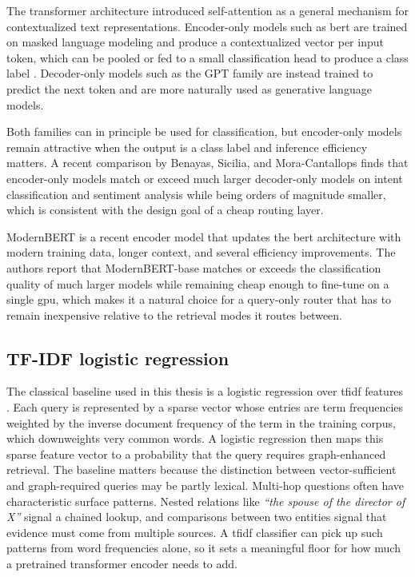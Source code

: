 \documentclass[english, bibtex]{kththesis}               %
\numberwithin{listing}{chapter}
\begin{document}
The transformer architecture \cite{vaswani2017attention} introduced self-attention as a general mechanism for contextualized text representations. Encoder-only models such as \gls{bert} are trained on masked language modeling and produce a contextualized vector per input token, which can be pooled or fed to a small classification head to produce a class label \cite{devlin2019bert}. Decoder-only models such as the GPT family are instead trained to predict the next token and are more naturally used as generative language models.

Both families can in principle be used for classification, but encoder-only models remain attractive when the output is a class label and inference efficiency matters. A recent comparison by Benayas, Sicilia, and Mora-Cantallops \cite{benayas2024encoder} finds that encoder-only models match or exceed much larger decoder-only models on intent classification and sentiment analysis while being orders of magnitude smaller, which is consistent with the design goal of a cheap routing layer.

ModernBERT \cite{warner2024modernbert} is a recent encoder model that updates the \gls{bert} architecture with modern training data, longer context, and several efficiency improvements. The authors report that ModernBERT-base matches or exceeds the classification quality of much larger models while remaining cheap enough to fine-tune on a single \gls{gpu}, which makes it a natural choice for a query-only router that has to remain inexpensive relative to the retrieval modes it routes between.

\subsection{TF-IDF logistic regression}
\label{sec:backgroundTfidf}

The classical baseline used in this thesis is a logistic regression over \gls{tfidf} features \cite{salton1988termweighting}. Each query is represented by a sparse vector whose entries are term frequencies weighted by the inverse document frequency of the term in the training corpus, which downweights very common words. A logistic regression then maps this sparse feature vector to a probability that the query requires graph-enhanced retrieval. The baseline matters because the distinction between vector-sufficient and graph-required queries may be partly lexical. Multi-hop questions often have characteristic surface patterns. Nested relations like \emph{``the spouse of the director of X''} signal a chained lookup, and comparisons between two entities signal that evidence must come from multiple sources. A \gls{tfidf} classifier can pick up such patterns from word frequencies alone, so it sets a meaningful floor for how much a pretrained transformer encoder needs to add.
\end{document}

